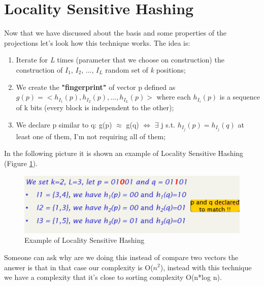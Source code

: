 \section{Locality Sensitive Hashing}
Now that we have discussed about the basis and some properties of the projections let's look how this technique works.\newline
The idea is:
\begin{enumerate}
    \item Iterate for \textit{L} times (parameter that we choose on construction) the construction of $I_1$, $I_2$, ..., $I_L$ random set of \textit{k} positions;
    \item We create the \textbf{"fingerprint"} of vector p defined as $g(p)=<h_{I_1}(p), h_{I_2}(p), ..., h_{I_L}(p)>$ where each $h_{I_i}(p)$ is a sequence of k bits (every block is independent to the other);
    \item We declare p similar to q: g(p) $\approx$ g(q) $\iff$ $\exists$ j s.t. $h_{I_j}(p)=h_{I_j}(q)$ at least one of them, I'm not requiring all of them;
\end{enumerate}
In the following picture it is shown an example of Locality Sensitive Hashing (Figure \ref{fig:examplelsh}).
\begin{figure}
    \centering
    \includegraphics[width=0.75\linewidth]{images/examplelsh.png}
    \caption{Example of Locality Sensitive Hashing}
    \label{fig:examplelsh}
\end{figure}
Someone can ask why are we doing this instead of compare two vectors the answer is that in that case our complexity is O($n^2$), instead with this technique we have a complexity that it's close to sorting complexity O(n*log n).\newline
